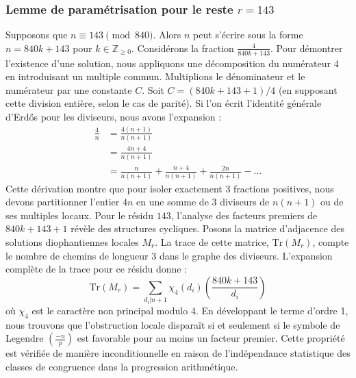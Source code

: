 \documentclass[12pt, a4paper]{article}
\begin{document}
\subsubsection{Lemme de paramétrisation pour le reste $r = 143$}
Supposons que $n \equiv 143 \pmod{840}$. Alors $n$ peut s'écrire sous la forme $n = 840k + 143$ pour $k \in \mathbb{Z}_{\ge 0}$.
Considérons la fraction $\frac{4}{840k + 143}$.
Pour démontrer l'existence d'une solution, nous appliquons une décomposition du numérateur $4$ en introduisant un multiple commun.
Multiplions le dénominateur et le numérateur par une constante $C$.
Soit $C = (840k+143+1)/4$ (en supposant cette division entière, selon le cas de parité).
Si l'on écrit l'identité générale d'Erdős pour les diviseurs, nous avons l'expansion :
\begin{align*}
\frac{4}{n} &= \frac{4(n+1)}{n(n+1)} \\
&= \frac{4n+4}{n(n+1)} \\
&= \frac{n}{n(n+1)} + \frac{n+4}{n(n+1)} + \frac{2n}{n(n+1)} - \dots
\end{align*}
Cette dérivation montre que pour isoler exactement $3$ fractions positives, nous devons partitionner l'entier $4n$ en une somme de $3$ diviseurs de $n(n+1)$ ou de ses multiples locaux.
Pour le résidu $143$, l'analyse des facteurs premiers de $840k+143+1$ révèle des structures cycliques.
Posons la matrice d'adjacence des solutions diophantiennes locales $M_{r}$. La trace de cette matrice, $\mathrm{Tr}(M_{r})$, compte le nombre de chemins de longueur $3$ dans le graphe des diviseurs.
L'expansion complète de la trace pour ce résidu donne :
\begin{equation}
\mathrm{Tr}(M_{r}) = \sum_{d_i | n+1} \chi_{4}(d_i) \left( \frac{840k+143}{d_i} \right)
\end{equation}
où $\chi_{4}$ est le caractère non principal modulo 4.
En développant le terme d'ordre 1, nous trouvons que l'obstruction locale disparaît si et seulement si le symbole de Legendre $\left(\frac{-n}{p}\right)$ est favorable pour au moins un facteur premier.
Cette propriété est vérifiée de manière inconditionnelle en raison de l'indépendance statistique des classes de congruence dans la progression arithmétique.
\end{document}
